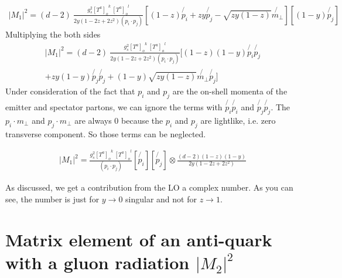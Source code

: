 \begin{equation}
\begin{split}
|M_1|^2=(d-2)\:\frac{g_s^2  {[T^a]_{o}}^k \: {[T^a]_o}^l }{2y(1-2z+2z^2)(p_i \cdot p_j)}
[(1-z) \not{p_i}+zy \not{p_j} - \sqrt{zy(1-z)} \not{{m}_{\bot}}]
[(1-y) \not{p_j}]
\end{split}
\end{equation}
Multiplying the both sides 
\begin{equation}
\begin{split}
|M_1|^2=(d-2)\:\frac{g_s^2  {[T^a]_{o}}^k \: {[T^a]_o}^l }{2y(1-2z+2z^2)(p_i \cdot p_j)}
[(1-z)(1-y) \not{p_i}\not{p_j} \\
+zy(1-y) \not{p_j}\not{p_j} + (1-y)\sqrt{zy(1-z)} \not{{m}_{\bot}}\not{p_j}]
\end{split}
\end{equation}
Under consideration of the fact that $ p_i $ and $ p_j $ are the on-shell momenta of the emitter and spectator partons, we can ignore the terms with $ \not{p_i} \not{p_i} $ and $ \not{p_j} \not{p_j} $.
The $ {p_i} \cdot  {m}_{\bot} $ and $ {p_j} \cdot  {m}_{\bot} $ are always $ 0 $ because the $ p_i $ and $ p_j $ are lightlike, i.e. zero transverse component. So those terms can be neglected.


\begin{equation}
\begin{split}
|M_1|^2=\frac{g_s^2  {[T^a]_{o}}^k \: {[T^a]_o}^l }{(p_i \cdot p_j)}
[\not{p_i}][\not{p_j}]\otimes\frac{(d-2)(1-z)(1-y)}{2y(1-2z+2z^2)}
\end{split}
\end{equation}

As discussed, we get a contribution from the LO a complex number. As you can see, the number is just for $ y \rightarrow 0 $ singular and not for $ z \rightarrow 1 $.

\newpage

\section{Matrix element of an anti-quark with a gluon radiation $ |M_2|^2 $}


